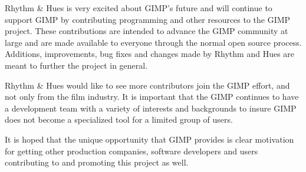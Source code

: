 Rhythm \& Hues is very excited about GIMP's future and will continue to support
GIMP by contributing programming and other resources to the GIMP project. These
contributions are intended to advance the GIMP community at large and are made
available to everyone through the normal open source process. Additions,
improvements, bug fixes and changes made by Rhythm and Hues are meant to
further the project in general.

Rhythm \& Hues would like to see more contributors join the GIMP effort, and
not only from the film industry. It is important that the GIMP continues to
have a development team with a variety of interests and backgrounds to insure
GIMP does not become a specialized tool for a limited group of users.

It is hoped that the unique opportunity that GIMP provides is clear motivation
for getting other production companies, software developers and users
contributing to and promoting this project as well.
